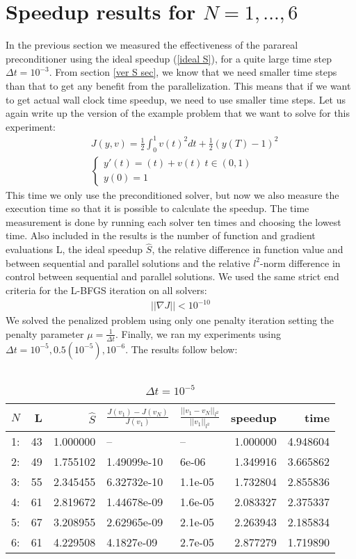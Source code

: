 \section{Speedup results for $N=1,...,6$}
In the previous section we measured the effectiveness of the parareal preconditioner using the ideal speedup (\ref{ideal S}), for a quite large time step $\Delta t =10^{-3}$. From section \ref{ver S sec}, we know that we need smaller time steps than that to get any benefit from the parallelization. This means that if we want to get actual wall clock time speedup, we need to use smaller time steps. Let us again write up the version of the example problem that we want to solve for this experiment:
\begin{align*}
&J(y,v) = \frac{1}{2}\int_0^1v(t)^2dt + \frac{1}{2}(y(T)-1)^2 \\
&\left\{
     \begin{array}{lr}
       	y'(t)=(t) + v(t) \ t\in(0,1)\\
       	y(0)=1
     \end{array}
   \right. 
\end{align*}
This time we only use the preconditioned solver, but now we also measure the execution time so that it is possible to calculate the speedup. The time measurement is done by running each solver ten times and choosing the lowest time. Also included in the results is the number of function and gradient evaluations L, the ideal speedup $\hat S$, the relative difference in function value and between sequential and parallel solutions and the relative $l^2$-norm difference in control between sequential and parallel solutions. We used the same strict end criteria for the L-BFGS iteration on all solvers:
\begin{align*}
||\nabla J||<10^{-10}
\end{align*}
We solved the penalized problem using only one penalty iteration setting the penalty parameter $\mu=\frac{1}{\Delta t}$. Finally, we ran my experiments using $\Delta t =10^{-5},0.5(10^{-5}),10^{-6}$. The results follow below:
\\
\\
\begin{table}[h]
\centering
\caption{$\Delta t = 10^{-5}$}
\begin{tabular}{lrrllrr}
\toprule
{} $N$&   L &        $\hat S$ &          $\frac{J(v_1)-J(v_N)}{J(v_1)}$ &    $\frac{||v_1-v_N||_{l^2}}{||v_1||_{l^2}}$&   speedup &      time \\
\midrule
1: &  43 &  1.000000 &           -- &       -- &  1.000000 &  4.948604 \\
2: &  49 &  1.755102 &  1.49099e-10 &    6e-06 &  1.349916 &  3.665862 \\
3: &  55 &  2.345455 &  6.32732e-10 &  1.1e-05 &  1.732804 &  2.855836 \\
4: &  61 &  2.819672 &  1.44678e-09 &  1.6e-05 &  2.083327 &  2.375337 \\
5: &  67 &  3.208955 &  2.62965e-09 &  2.1e-05 &  2.263943 &  2.185834 \\
6: &  61 &  4.229508 &   4.1827e-09 &  2.7e-05 &  2.877279 &  1.719890 \\
\bottomrule
\end{tabular}
\end{table}
